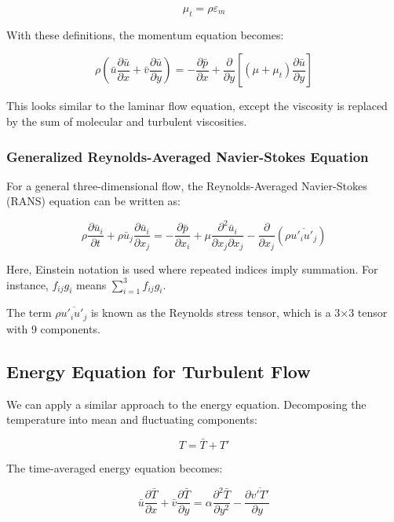 \[
\mu_t = \rho \varepsilon_m
\]

With these definitions, the momentum equation becomes:

\[
\rho \left(\bar{u}\frac{\partial \bar{u}}{\partial x} + \bar{v}\frac{\partial \bar{u}}{\partial y}\right) = -\frac{\partial \bar{p}}{\partial x} + \frac{\partial}{\partial y}\left[(\mu + \mu_t)\frac{\partial \bar{u}}{\partial y}\right]
\]

This looks similar to the laminar flow equation, except the viscosity is replaced by the sum of molecular and turbulent viscosities. 

\subsubsection*{Generalized Reynolds-Averaged Navier-Stokes Equation}

For a general three-dimensional flow, the Reynolds-Averaged Navier-Stokes (RANS) equation can be written as:

\[
\rho\frac{\partial \bar{u}_i}{\partial t} + \rho\bar{u}_j\frac{\partial \bar{u}_i}{\partial x_j} = -\frac{\partial \bar{p}}{\partial x_i} + \mu\frac{\partial^2 \bar{u}_i}{\partial x_j \partial x_j} - \frac{\partial}{\partial x_j}(\rho\overline{u'_i u'_j})
\]

Here, Einstein notation is used where repeated indices imply summation. For instance, $f_{ij}g_i$ means $\sum_{i=1}^3 f_{ij}g_i$.

The term $\rho\overline{u'_i u'_j}$ is known as the Reynolds stress tensor, which is a 3×3 tensor with 9 components.

\subsection*{Energy Equation for Turbulent Flow}

We can apply a similar approach to the energy equation. Decomposing the temperature into mean and fluctuating components:

\[
T = \bar{T} + T'
\]

The time-averaged energy equation becomes:

\[
\bar{u}\frac{\partial \bar{T}}{\partial x} + \bar{v}\frac{\partial \bar{T}}{\partial y} = \alpha\frac{\partial^2 \bar{T}}{\partial y^2} - \frac{\partial \overline{v'T'}}{\partial y}
\]


